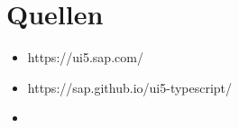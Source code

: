 \chapter*{Quellen}
\begin{itemize}
    \item https://ui5.sap.com/
    \item https://sap.github.io/ui5-typescript/
    \item 
\end{itemize}